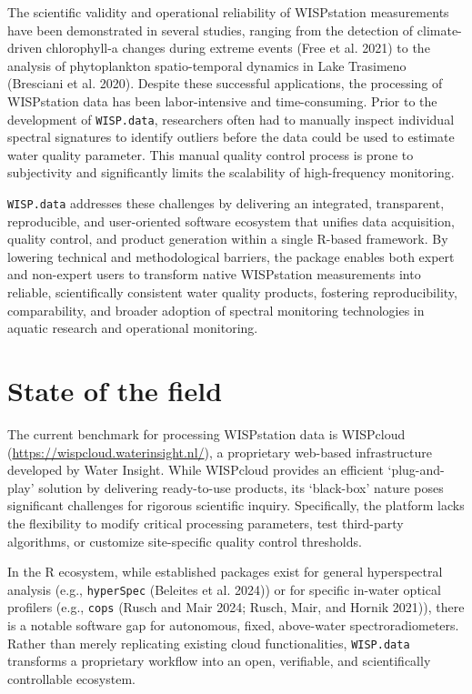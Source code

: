 \documentclass[
]{article}
\begin{document}
The scientific validity and operational reliability of WISPstation
measurements have been demonstrated in several studies, ranging from the
detection of climate-driven chlorophyll-a changes during extreme events
(Free et al. 2021) to the analysis of phytoplankton spatio-temporal
dynamics in Lake Trasimeno (Bresciani et al. 2020). Despite these
successful applications, the processing of WISPstation data has been
labor-intensive and time-consuming. Prior to the development of
\texttt{WISP.data}, researchers often had to manually inspect individual
spectral signatures to identify outliers before the data could be used
to estimate water quality parameter. This manual quality control process
is prone to subjectivity and significantly limits the scalability of
high-frequency monitoring.

\texttt{WISP.data} addresses these challenges by delivering an
integrated, transparent, reproducible, and user-oriented software
ecosystem that unifies data acquisition, quality control, and product
generation within a single R-based framework. By lowering technical and
methodological barriers, the package enables both expert and non-expert
users to transform native WISPstation measurements into reliable,
scientifically consistent water quality products, fostering
reproducibility, comparability, and broader adoption of spectral
monitoring technologies in aquatic research and operational monitoring.

\section{State of the field}\label{state-of-the-field}

The current benchmark for processing WISPstation data is WISPcloud
(\url{https://wispcloud.waterinsight.nl/}), a proprietary web-based
infrastructure developed by Water Insight. While WISPcloud provides an
efficient `plug-and-play' solution by delivering ready-to-use products,
its `black-box' nature poses significant challenges for rigorous
scientific inquiry. Specifically, the platform lacks the flexibility to
modify critical processing parameters, test third-party algorithms, or
customize site-specific quality control thresholds.

In the R ecosystem, while established packages exist for general
hyperspectral analysis (e.g., \texttt{hyperSpec} (Beleites et al. 2024))
or for specific in-water optical profilers (e.g., \texttt{cops} (Rusch
and Mair 2024; Rusch, Mair, and Hornik 2021)), there is a notable
software gap for autonomous, fixed, above-water spectroradiometers.
Rather than merely replicating existing cloud functionalities,
\texttt{WISP.data} transforms a proprietary workflow into an open,
verifiable, and scientifically controllable ecosystem.
\end{document}
